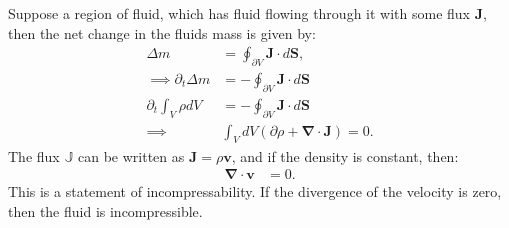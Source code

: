 \documentclass[a4paper]{article}
\newcommand{\dive}[1]{\mathbf{\nabla}\cdot \mathbf{#1}}
\begin{document}
\vspace*{0.5cm}\noindent
Suppose a region of fluid, which has fluid flowing through it with some flux $\mathbf{J}$, then the net change in the fluids mass is given by:
\begin{align*}
    \Delta m &= \oint_{\partial V} \mathbf{J}\cdot d\mathbf{S},\\
    \implies \partial_t \Delta m &= - \oint_{\partial V} \mathbf{J}\cdot d\mathbf{S}\\
    \partial_t\int_V \rho dV &= -\oint_{\partial V} \mathbf{J}\cdot d\mathbf{S}\\
    \implies& \int_V dV\left(\partial \rho + \dive{J}\right) = 0.
\end{align*}The flux $\mathbb{J}$ can be written as $\mathbf{J} = \rho\mathbf{v}$, and if the density is constant, then:
\begin{align*}
    \dive{v} &= 0.
\end{align*}This is a statement of incompressability. If the divergence of the velocity is zero, then the fluid is incompressible.
\end{document}

